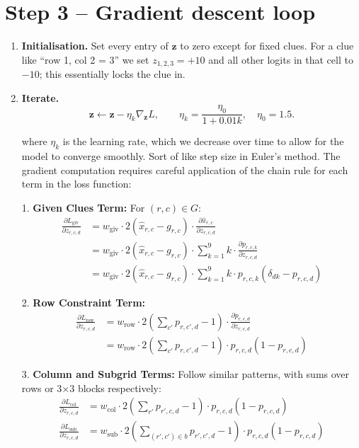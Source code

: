 \documentclass[12pt]{article}
\begin{document}
\section{Step 3 -- Gradient descent loop}
\begin{enumerate}
    \item \textbf{Initialisation.} Set every entry of $\mathbf z$ to zero except for
          fixed clues. For a clue like ``row 1, col 2 = 3'' we set $z_{1,2,3}=+10$ and
          all other logits in that cell to $-10$; this essentially locks the clue in.
    
    \item \textbf{Iterate.}
          \begin{equation*}
              \mathbf z \leftarrow \mathbf z - \eta_k \nabla_{\mathbf z} L, \qquad
              \eta_k = \frac{\eta_0}{1+0.01k}, \quad \eta_0=1.5.
          \end{equation*}

          where $\eta_k$ is the learning rate, which we decrease over time to allow for the model to converge smoothly. Sort of like step size in Euler's method.
        The gradient computation requires careful application of the chain rule for each term in the loss function:

        1. \textbf{Given Clues Term:} For $(r,c) \in G$:
           \begin{align*}
           \frac{\partial L_{\text{giv}}}{\partial z_{r,c,d}} &= w_{\text{giv}} \cdot 2(\hat x_{r,c}-g_{r,c}) \cdot \frac{\partial \hat x_{r,c}}{\partial z_{r,c,d}} \\
           &= w_{\text{giv}} \cdot 2(\hat x_{r,c}-g_{r,c}) \cdot \sum_{k=1}^9 k \cdot \frac{\partial p_{r,c,k}}{\partial z_{r,c,d}} \\
           &= w_{\text{giv}} \cdot 2(\hat x_{r,c}-g_{r,c}) \cdot \sum_{k=1}^9 k \cdot p_{r,c,k}(\delta_{dk} - p_{r,c,d})
           \end{align*}

        2. \textbf{Row Constraint Term:} 
           \begin{align*}
           \frac{\partial L_{\text{row}}}{\partial z_{r,c,d}} &= w_{\text{row}} \cdot 2\left(\sum_{c'} p_{r,c',d}-1\right) \cdot \frac{\partial p_{r,c,d}}{\partial z_{r,c,d}} \\
           &= w_{\text{row}} \cdot 2\left(\sum_{c'} p_{r,c',d}-1\right) \cdot p_{r,c,d}(1-p_{r,c,d})
           \end{align*}

        3. \textbf{Column and Subgrid Terms:} Follow similar patterns, with sums over rows or 3×3 blocks respectively:
           \begin{align*}
           \frac{\partial L_{\text{col}}}{\partial z_{r,c,d}} &= w_{\text{col}} \cdot 2\left(\sum_{r'} p_{r',c,d}-1\right) \cdot p_{r,c,d}(1-p_{r,c,d}) \\
           \frac{\partial L_{\text{sub}}}{\partial z_{r,c,d}} &= w_{\text{sub}} \cdot 2\left(\sum_{(r',c')\in b} p_{r',c',d}-1\right) \cdot p_{r,c,d}(1-p_{r,c,d})
           \end{align*}


\end{enumerate}
\end{document}
